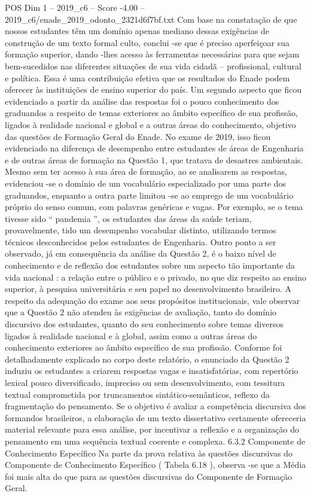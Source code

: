 \begin{textsample}{POS Dim 1 – 2019\_c6 – Score -4.00 – 2019\_c6/enade\_2019\_odonto\_2321d6f7bf.txt}
Com base na constatação de que nossos estudantes têm um domínio apenas mediano dessas exigências de construção de um texto formal culto, conclui -se que é preciso aperfeiçoar sua formação superior, dando -lhes acesso às ferramentas necessárias para que sejam bem-sucedidos nas diferentes situações de sua vida cidadã – profissional, cultural e política.
Essa é uma contribuição efetiva que os resultados do Enade podem oferecer às instituições de ensino superior do país.
Um segundo aspecto que ficou evidenciado a partir da análise das respostas foi o pouco conhecimento dos graduandos a respeito de temas exteriores ao âmbito específico de sua profissão, ligados à realidade nacional e global e a outras áreas do conhecimento, objetivo das questões de Formação Geral do Enade.
No exame de 2019, isso ficou evidenciado na diferença de desempenho entre estudantes de áreas de Engenharia e de outras áreas de formação na Questão 1, que tratava de desastres ambientais.
Mesmo sem ter acesso à sua área de formação, ao se analisarem as respostas, evidenciou -se o domínio de um vocabulário especializado por uma parte dos graduandos, enquanto a outra parte limitou -se ao emprego de um vocabulário próprio do senso comum, com palavras genéricas e vagas.
Por exemplo, se o tema tivesse sido “ pandemia ”, os estudantes das áreas da saúde teriam, provavelmente, tido um desempenho vocabular distinto, utilizando termos técnicos desconhecidos pelos estudantes de Engenharia.
Outro ponto a ser observado, já em consequência da análise da Questão 2, é o baixo nível de conhecimento e de reflexão dos estudantes sobre um aspecto tão importante da vida nacional : a relação entre o público e o privado, no que diz respeito ao ensino superior, à pesquisa universitária e seu papel no desenvolvimento brasileiro.
A respeito da adequação do exame aos seus propósitos institucionais, vale observar que a Questão 2 não atendeu às exigências de avaliação, tanto do domínio discursivo dos estudantes, quanto do seu conhecimento sobre temas diversos ligados à realidade nacional e à global, assim como a outras áreas do conhecimento exteriores ao âmbito específico de sua profissão.
Conforme foi detalhadamente explicado no corpo deste relatório, o enunciado da Questão 2 induziu os estudantes a criarem respostas vagas e insatisfatórias, com repertório lexical pouco diversificado, impreciso ou sem desenvolvimento, com tessitura textual comprometida por truncamentos sintático-semânticos, reflexo da fragmentação do pensamento.
Se o objetivo é avaliar a competência discursiva dos formandos brasileiros, a elaboração de um texto dissertativo certamente ofereceria material relevante para essa análise, por incentivar a reflexão e a organização do pensamento em uma sequência textual coerente e complexa. 6.3.2 Componente de Conhecimento Específico Na parte da prova relativa às questões discursivas do Componente de Conhecimento Específico ( Tabela 6.18 ), observa -se que a Média foi mais alta do que para as questões discursivas do Componente de Formação Geral.

\end{textsample}
